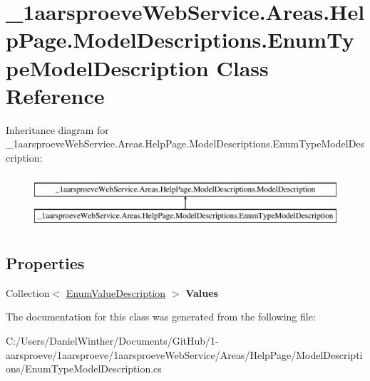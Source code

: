 \hypertarget{class__1aarsproeve_web_service_1_1_areas_1_1_help_page_1_1_model_descriptions_1_1_enum_type_model_description}{}\section{\+\_\+1aarsproeve\+Web\+Service.\+Areas.\+Help\+Page.\+Model\+Descriptions.\+Enum\+Type\+Model\+Description Class Reference}
\label{class__1aarsproeve_web_service_1_1_areas_1_1_help_page_1_1_model_descriptions_1_1_enum_type_model_description}
Inheritance diagram for \+\_\+1aarsproeve\+Web\+Service.\+Areas.\+Help\+Page.\+Model\+Descriptions.\+Enum\+Type\+Model\+Description\+:\begin{figure}[H]
\begin{center}
\leavevmode
\includegraphics[height=2.000000cm]{class__1aarsproeve_web_service_1_1_areas_1_1_help_page_1_1_model_descriptions_1_1_enum_type_model_description}
\end{center}
\end{figure}
\subsection*{Properties}
\begin{DoxyCompactItemize}
\item 
\hypertarget{class__1aarsproeve_web_service_1_1_areas_1_1_help_page_1_1_model_descriptions_1_1_enum_type_model_description_a0d1a08eead95b9223e53b77770bc8703}{}Collection$<$ \hyperlink{class__1aarsproeve_web_service_1_1_areas_1_1_help_page_1_1_model_descriptions_1_1_enum_value_description}{Enum\+Value\+Description} $>$ {\bfseries Values}\label{class__1aarsproeve_web_service_1_1_areas_1_1_help_page_1_1_model_descriptions_1_1_enum_type_model_description_a0d1a08eead95b9223e53b77770bc8703}

\end{DoxyCompactItemize}


The documentation for this class was generated from the following file\+:\begin{DoxyCompactItemize}
\item 
C\+:/\+Users/\+Daniel\+Winther/\+Documents/\+Git\+Hub/1-\/aarsproeve/1aarsproeve/1aarsproeve\+Web\+Service/\+Areas/\+Help\+Page/\+Model\+Descriptions/Enum\+Type\+Model\+Description.\+cs\end{DoxyCompactItemize}
